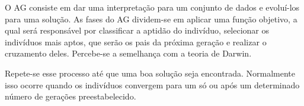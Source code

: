 \documentclass[]{article}
\begin{document}
	O AG consiste em dar uma interpretação para um conjunto de dados e evoluí-los para uma solução. As fases do AG dividem-se em aplicar uma função objetivo, a qual será responsável por classificar a aptidão do indivíduo, selecionar os indivíduos mais aptos, que serão os pais da próxima geração e realizar o cruzamento deles. Percebe-se a semelhança com a teoria de Darwin.
	
	Repete-se esse processo até que uma boa solução seja encontrada. Normalmente isso ocorre quando os indivíduos convergem para um só ou após um determinado número de gerações preestabelecido.
\end{document}

